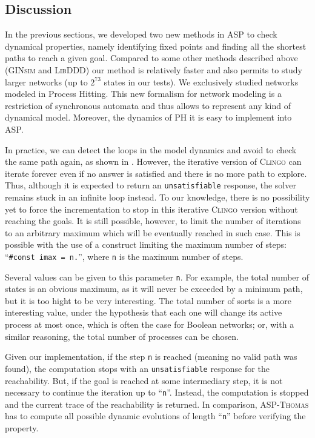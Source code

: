 \subsection{Discussion}
\label{sec:discussion}

In the previous sections,
we developed two new methods in ASP to check dynamical properties,
namely identifying fixed points and finding all the shortest paths to reach a given goal.
Compared to some other methods described above
(\textsc{GINsim} and \textsc{LibDDD}) our method is relatively faster and also permits to study larger networks
(up to $2^{73}$ states in our tests). We exclusively studied networks modeled in Process Hitting. This new formalism for network modeling is a restriction of synchronous automata and thus allows to represent any kind of dynamical model. Moreover, the dynamics of PH it is easy to implement into ASP.

In practice, we can detect the loops in the model dynamics and avoid to check the same path again, as shown in .
However, the iterative version of \textsc{Clingo} can iterate forever even if no answer is satisfied and there is no more path to explore.
Thus, although it is expected to return an \texttt{unsatisfiable} response, the solver remains stuck in an infinite loop instead.
To our knowledge, there is no possibility yet to force the incrementation to stop in this iterative \textsc{Clingo} version without reaching the goals.
It is still possible, however, to limit the number of iterations to an arbitrary
maximum which will be eventually reached in such case.
This is possible with the use of a construct limiting the maximum number of steps: ``\texttt{\#const imax = n.}'',
where \texttt{n} is the maximum number of steps.

Several values can be given to this parameter \texttt{n}.
For example, the total number of states is an obvious maximum,
as it will never be exceeded by a minimum path,
but it is too hight to be very interesting.
The total number of sorts is a more interesting value,
under the hypothesis that each one will change its active process at most once,
which is often the case for Boolean networks;
or, with a similar reasoning, the total number of processes can be chosen.

Given our implementation, if the step \texttt{n} is reached (meaning no valid path was found),
the computation stops with an \texttt{unsatisfiable} response for the reachability.
But, if the goal is reached at some intermediary step, it is not necessary to continue the iteration up to ``\texttt{n}''.
Instead, the computation is stopped and the current trace of the reachability is returned.
In comparison, \textsc{ASP-Thomas} has to compute all possible dynamic evolutions of length ``\texttt{n}'' before verifying the property.
